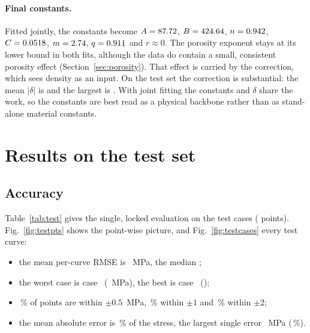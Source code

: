 \documentclass[11pt,a4paper]{article}
\begin{document}
\paragraph{Final constants.} Fitted jointly, the constants become $A=87.72$, $B=424.64$, $n=0.942$, $C=0.0518$, $m=2.74$, $q=0.911$ and $r\approx0$. The porosity exponent stays at its lower bound in both fits, although the data do contain a small, consistent porosity effect (Section~\ref{sec:porosity}). That effect is carried by the correction, which sees density as an input. On the test set the correction is substantial: the mean $|\delta|$ is \nDeltaMean{} and the largest is \nDeltaMax{}. With joint fitting the constants and $\delta$ share the work, so the constants are best read as a physical backbone rather than as stand-alone material constants.

\section{Results on the test set}
\subsection{Accuracy}
Table~\ref{tab:test} gives the single, locked evaluation on the \nTestCases{} test cases (\nTestPoints{} points). Fig.~\ref{fig:testpts} shows the point-wise picture, and Fig.~\ref{fig:testcases} every test curve:
\begin{itemize}
\item the mean per-curve RMSE is \nTestMean{}~MPa, the median \nTestMedian{};
\item the worst case is case~\nTestWorstCase{} (\nTestWorst{}~MPa), the best is case~\nTestBestCase{} (\nTestBest{});
\item \nTestWithinHalf\,\% of points are within $\pm0.5$~MPa, \nTestWithinOne\,\% within $\pm1$ and \nTestWithinTwo\,\% within $\pm2$;
\item the mean absolute error is \nTestMeanPct\,\% of the stress, the largest single error \nTestMaxAbs{}~MPa (\nTestMaxPct\,\%).
\end{itemize}
\end{document}
